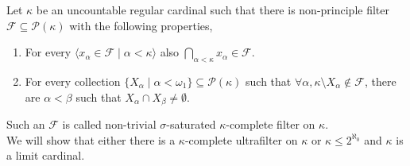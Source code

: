 \question{}
Let $\kappa$ be an uncountable regular cardinal such that there is non-principle filter $\mathcal{F} \subseteq \mathcal{P}(\kappa)$ with the following properties,
\begin{enumerate}
	\item For every $\langle x_\alpha \in \mathcal{F} \mid \alpha < \kappa \rangle$ also $\bigcap_{\alpha < \kappa} x_\alpha \in \mathcal{F}$.
	\item For every collection $\{ X_\alpha \mid \alpha < \omega_1 \} \subseteq \mathcal{P}(\kappa)$ such that $\forall \alpha, \kappa \setminus X_\alpha \notin \mathcal{F}$,
		there are $\alpha < \beta$ such that $X_\alpha \cap X_\beta \ne \emptyset$.
\end{enumerate}
Such an $\mathcal{F}$ is called non-trivial $\sigma$-saturated $\kappa$-complete filter on $\kappa$. \\
We will show that either there is a $\kappa$-complete ultrafilter on $\kappa$ or $\kappa \le 2^{\aleph_0}$ and $\kappa$ is a limit cardinal.
